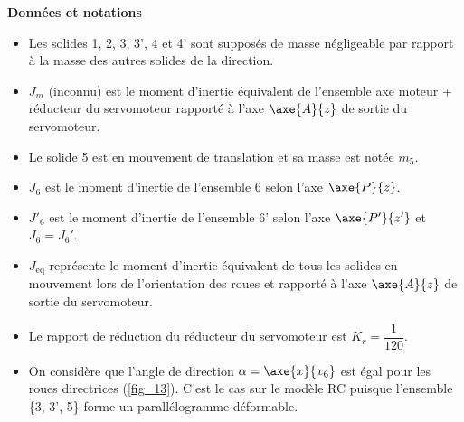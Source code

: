 \textbf{Données et notations}
\begin{itemize}
\item Les solides 1, 2, 3, 3’, 4 et 4’ sont supposés de masse négligeable par rapport à la masse des autres solides
de la direction.
\item $J_m$ (inconnu) est le moment d’inertie équivalent de l’ensemble {axe moteur + réducteur} du servomoteur rapporté à l’axe $\axe{A}{z}$ de sortie du servomoteur.
\item Le solide 5 est en mouvement de translation et sa masse est notée $m_5$.
\item $J_6$ est le moment d’inertie de l’ensemble 6 selon l’axe $\axe{P}{z}$.
\item $J'_6$ est le moment d’inertie de l’ensemble 6’ selon l’axe $\axe{P'}{z'}$ et $J_6 = J_6'$.
\item $J_{\text{eq}}$ représente le moment d’inertie équivalent de tous les solides en mouvement lors de l’orientation des roues et rapporté à l’axe $\axe{A}{z}$ de sortie du servomoteur.
\item Le rapport de réduction du réducteur du servomoteur est $K_r = \dfrac{1}{120}$.
\item On considère que l’angle de direction $\alpha = \axe{x}{x_6}$ est égal pour les roues directrices (\autoref{fig_13}). C’est le cas
sur le modèle RC puisque l’ensemble \{3, 3’, 5\} forme un parallélogramme déformable.
\end{itemize}

\ifprof
\begin{corrige}
\end{corrige}
\else
\fi

\ifprof
\begin{corrige}
\end{corrige}
\else
\fi

\ifprof
\begin{corrige}
\end{corrige}
\else
\fi

